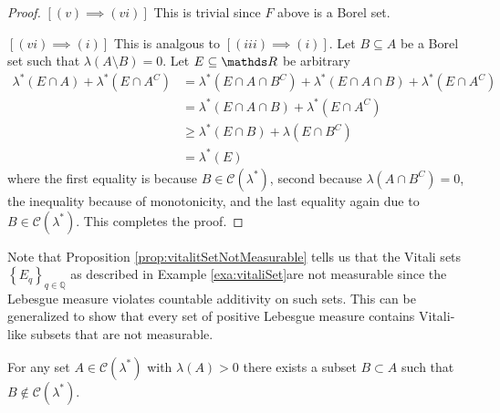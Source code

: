 \begin{proof}
$\left[\left(v\right)\implies\left(vi\right)\right]$ This is trivial
since $F$ above is a Borel set.

$\left[\left(vi\right)\implies\left(i\right)\right]$ This is analgous
to $\left[\left(iii\right)\implies\left(i\right)\right].$ Let $B\subseteq A$
be a Borel set such that $\lambda\left(A\setminus B\right)=0$. Let
$E\subseteq\R$ be arbitrary
\begin{align*}
\lambda^{*}\left(E\cap A\right)+\lambda^{*}\left(E\cap A^{C}\right) & =\lambda^{*}\left(E\cap A\cap B^{C}\right)+\lambda^{*}\left(E\cap A\cap B\right)+\lambda^{*}\left(E\cap A^{C}\right)\\
 & =\lambda^{*}\left(E\cap A\cap B\right)+\lambda^{*}\left(E\cap A^{C}\right)\\
 & \geq\lambda^{*}\left(E\cap B\right)+\lambda\left(E\cap B^{C}\right)\\
 & =\lambda^{*}\left(E\right)
\end{align*}
where the first equality is because $B\in\mathcal{C}\left(\lambda^{*}\right)$,
second because $\lambda\left(A\cap B^{C}\right)=0$, the inequality
because of monotonicity, and the last equality again due to $B\in\mathcal{C}\left(\lambda^{*}\right)$.
This completes the proof.
\end{proof}
Note that Proposition \ref{prop:vitalitSetNotMeasurable} tells us
that the Vitali sets $\left\{ E_{q}\right\} _{q\in\mathbb{Q}}$ as
described in Example \ref{exa:vitaliSet}are not measurable since
the Lebesgue measure violates countable additivity on such sets. This
can be generalized to show that every set of positive Lebesgue measure
contains Vitali-like subsets that are not measurable.
\begin{thm}
\label{thm:positiveMeasureNonMeasurable}For any set $A\in\mathcal{C}\left(\lambda^{*}\right)$
with $\lambda\left(A\right)>0$ there exists a subset $B\subset A$
such that $B\notin\mathcal{C}\left(\lambda^{*}\right)$.
\end{thm}

